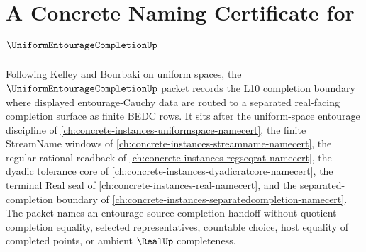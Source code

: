 \chapter{A Concrete Naming Certificate for $\UniformEntourageCompletionUp$}
\label{ch:concrete-instances-uniform-entourage-completion-namecert}

Following Kelley and Bourbaki on uniform spaces, the $\UniformEntourageCompletionUp$ packet records the L10 completion boundary where displayed entourage-Cauchy data are routed to a separated real-facing completion surface as finite BEDC rows. It sits after the uniform-space entourage discipline of \autoref{ch:concrete-instances-uniformspace-namecert}, the finite StreamName windows of \autoref{ch:concrete-instances-streamname-namecert}, the regular rational readback of \autoref{ch:concrete-instances-regseqrat-namecert}, the dyadic tolerance core of \autoref{ch:concrete-instances-dyadicratcore-namecert}, the terminal Real seal of \autoref{ch:concrete-instances-real-namecert}, and the separated-completion boundary of \autoref{ch:concrete-instances-separatedcompletion-namecert}. The packet names an entourage-source completion handoff without quotient completion equality, selected representatives, countable choice, host equality of completed points, or ambient $\RealUp$ completeness.

